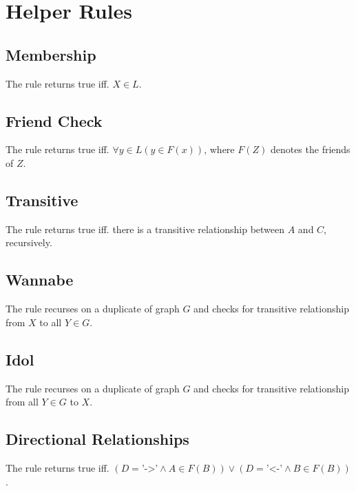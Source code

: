 %
%

\section{Helper Rules}
\label{helpers}

\subsection{Membership}
\label{appendix:member_of}
The  rule returns true iff. $X \in L$.

\subsection{Friend Check}
\label{appendix:friendCheck}
The  rule returns true iff. $\forall y \in L ( y \in F(x)
)$, where $F(Z)$ denotes the friends of $Z$.

\subsection{Transitive}
\label{appendix:transitive}
The  rule returns true iff. there is a transitive
relationship between $A$ and $C$, recursively.

\subsection{Wannabe}
\label{appendix:is_wannabe}
The  rule recurses on a duplicate of graph $G$ and checks
for transitive relationship from $X$ to all $Y \in G$.

\subsection{Idol}
\label{appendix:is_idol}
The  rule recurses on a duplicate of graph $G$ and checks
for transitive relationship from all $Y \in G$ to $X$.

\subsection{Directional Relationships}
\label{appendix:drel}
The  rule returns true iff. $( D = \text{'->'} \land A \in F(B) )
\lor ( D = \text{'<-'} \land B \in F(B) )$.
